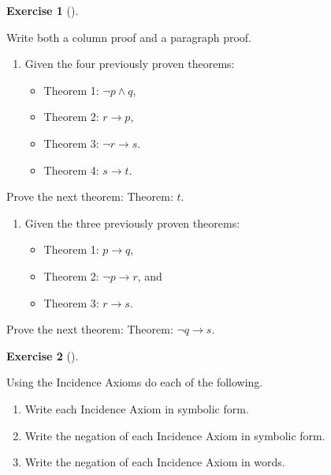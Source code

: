\documentclass[
  letterpaper,
  10pt,
  reqno,
  twopage,
  openany]{book}
\providecommand{\tightlist}{%
  \setlength{\itemsep}{0pt}\setlength{\parskip}{0pt}}\usepackage{longtable,booktabs,array}
\theoremstyle{plain}
\theoremstyle{definition}
\newtheorem{exercise}{Exercise}[chapter]
\theoremstyle{definition}
\theoremstyle{definition}
\theoremstyle{plain}
\theoremstyle{plain}
\theoremstyle{remark}
\begin{document}
\leavevmode{}%
\begin{exercise}[]\label{exr-write-column-proof-paragraph-proof}

Write both a column proof and a paragraph proof.

\begin{enumerate}
\def\labelenumi{\arabic{enumi}.}
\item
  Given the four previously proven theorems:

  \begin{itemize}
  \tightlist
  \item
    Theorem 1: \(\neg p \land q\),\\
  \item
    Theorem 2: \(r\rightarrow p\),\\
  \item
    Theorem 3: \(\neg r \rightarrow s\).
  \item
    Theorem 4: \(s\rightarrow t\).
  \end{itemize}
\end{enumerate}

Prove the next theorem: Theorem: \(t\).

\begin{enumerate}
\def\labelenumi{\arabic{enumi}.}
\setcounter{enumi}{1}
\item
  Given the three previously proven theorems:

  \begin{itemize}
  \tightlist
  \item
    Theorem 1: \(p\rightarrow q\),
  \item
    Theorem 2: \(\neg p \rightarrow r\), and
  \item
    Theorem 3: \(r\rightarrow s\).
  \end{itemize}
\end{enumerate}

Prove the next theorem: Theorem: \(\neg q \rightarrow s\).

\end{exercise}

\leavevmode{}%
\begin{exercise}[]\label{exr-incidaxioms}

Using the Incidence Axioms do each of the following.

\begin{enumerate}
\def\labelenumi{\arabic{enumi}.}
\tightlist
\item
  Write each Incidence Axiom in symbolic form.
\item
  Write the negation of each Incidence Axiom in symbolic form.
\item
  Write the negation of each Incidence Axiom in words.
\end{enumerate}

\end{exercise}
\end{document}
